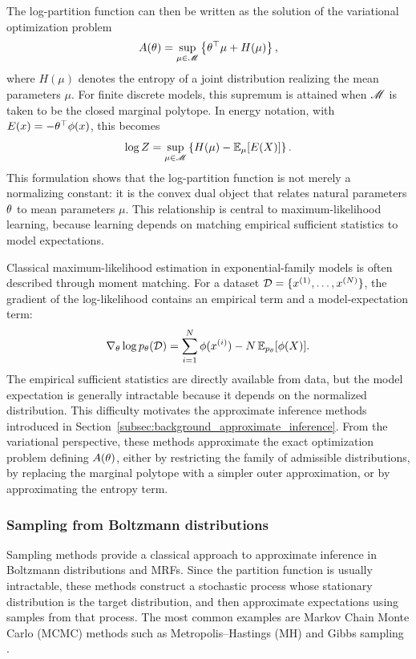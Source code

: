 The log-partition function can then be written as the solution of the variational optimization problem
\begin{equation}
    A(\theta) = \sup_{\mu\in\mathscr{M}} \left\{ \theta^\top \mu + H(\mu) \right\},
\end{equation}
where $H(\mu)$ denotes the entropy of a joint distribution realizing the mean parameters $\mu$. For finite discrete models, this supremum is attained when $\mathscr{M}$ is taken to be the closed marginal polytope. In energy notation, with $E(x)=-\theta^\top\phi(x)$, this becomes
\begin{equation}
    \log Z = \sup_{\mu\in\mathscr{M}} \left\{ H(\mu) - \mathbb{E}_{\mu}[E(X)] \right\}.
\end{equation}
This formulation shows that the log-partition function is not merely a normalizing constant: it is the convex dual object that relates natural parameters $\theta$ to mean parameters \(\mu\). This relationship is central to maximum-likelihood learning, because learning depends on matching empirical sufficient statistics to model expectations.

Classical maximum-likelihood estimation in exponential-family models is often described through moment matching. For a dataset $\mathcal{D}=\{x^{(1)},\dots,x^{(N)}\}$, the gradient of the log-likelihood contains an empirical term and a model-expectation term:
\begin{equation}
\nabla_\theta \log p_\theta(\mathcal{D}) 
= 
\sum_{i=1}^N \phi(x^{(i)}) 
- 
N \,\mathbb{E}_{p_\theta}[\phi(X)] .
\end{equation}
The empirical sufficient statistics are directly available from data, but the model expectation is generally intractable because it depends on the normalized distribution. This difficulty motivates the approximate inference methods introduced in Section~\ref{subsec:background_approximate_inference}. From the variational perspective, these methods approximate the exact optimization problem defining $A(\theta)$, either by restricting the family of admissible distributions, by replacing the marginal polytope with a simpler outer approximation, or by approximating the entropy term.

\subsubsection{Sampling from Boltzmann distributions}

Sampling methods provide a classical approach to approximate inference in Boltzmann distributions and MRFs. Since the partition function is usually intractable, these methods construct a stochastic process whose stationary distribution is the target distribution, and then approximate expectations using samples from that process. The most common examples are Markov Chain Monte Carlo (MCMC) methods such as Metropolis--Hastings (MH) and Gibbs sampling \citep{metropolis_monte_1949,hastings_monte_1970,geman_stochastic_1984}.

